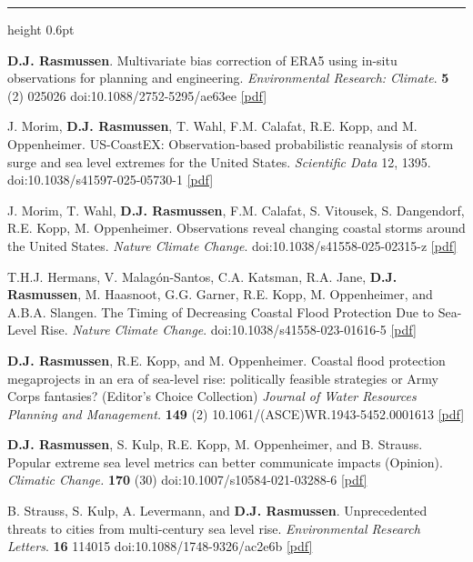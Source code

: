 \documentclass[10.5pt]{article}
\newcommand{\cvsection}[1]{%
  \par\addvspace{12pt}\pagebreak[3]%
  {\sffamily\bfseries\small\textls[80]{\MakeUppercase{#1}}}%
  \par\vspace{2pt}%
  {\color{rulegray}\hrule height 0.6pt}%
  \vspace{5pt}\nopagebreak}
\renewcommand{\section}[1]{\cvsection{#1}}
\newcommand{\yr}[1]{{\sffamily\bfseries #1}}
\begin{document}
\section{Journal Articles}
\begin{entries}
\item[\yr{2026}] \textbf{D.J. Rasmussen}. Multivariate bias correction of ERA5 using in-situ observations for planning and engineering. \emph{Environmental Research: Climate}. \textbf{5} (2) 025026 doi:10.1088/2752-5295/ae63ee \href{https://iopscience.iop.org/article/10.1088/2752-5295/ae63ee/pdf}{[pdf]}
\item[\yr{2025}] J. Morim, \textbf{D.J. Rasmussen}, T. Wahl, F.M. Calafat, R.E. Kopp, and M. Oppenheimer. US-CoastEX: Observation-based probabilistic reanalysis of storm surge and sea level extremes for the United States. \emph{Scientific Data} 12, 1395. doi:10.1038/s41597-025-05730-1 \href{https://www.nature.com/articles/s41597-025-05730-1.pdf}{[pdf]}
\item[\yr{2025}] J. Morim, T. Wahl, \textbf{D.J. Rasmussen}, F.M. Calafat, S. Vitousek, S. Dangendorf, R.E. Kopp, M. Oppenheimer. Observations reveal changing coastal storms around the United States. \emph{Nature Climate Change}. doi:10.1038/s41558-025-02315-z \href{https://www.nature.com/articles/s41558-025-02315-z}{[pdf]}
\item[\yr{2023}] T.H.J. Hermans, V. Malagón-Santos, C.A. Katsman, R.A. Jane, \textbf{D.J. Rasmussen}, M. Haasnoot, G.G. Garner, R.E. Kopp, M. Oppenheimer, and A.B.A. Slangen. The Timing of Decreasing Coastal Flood Protection Due to Sea-Level Rise. \emph{Nature Climate Change}. doi:10.1038/s41558-023-01616-5 \href{https://www.nature.com/articles/s41558-023-01616-5}{[pdf]}
\item[\yr{2023}] \textbf{D.J. Rasmussen}, R.E. Kopp, and M. Oppenheimer. Coastal flood protection megaprojects in an era of sea-level rise: politically feasible strategies or Army Corps fantasies? (Editor's Choice Collection) \emph{Journal of Water Resources Planning and Management.} \textbf{149} (2) 10.1061/(ASCE)WR.1943-5452.0001613 \href{https://ascelibrary.org/doi/10.1061/%28ASCE%29WR.1943-5452.0001613}{[pdf]}
\item[\yr{2022}] \textbf{D.J. Rasmussen}, S. Kulp, R.E. Kopp, M. Oppenheimer, and B. Strauss. Popular extreme sea level metrics can better communicate impacts (Opinion). \emph{Climatic Change.} \textbf{170} (30) doi:10.1007/s10584-021-03288-6 \href{https://link.springer.com/article/10.1007/s10584-021-03288-6}{[pdf]}
\item[\yr{2021}] B. Strauss, S. Kulp, A. Levermann, and \textbf{D.J. Rasmussen}. Unprecedented threats to cities from multi-century sea level rise. \emph{Environmental Research Letters}. \textbf{16} 114015 doi:10.1088/1748-9326/ac2e6b \href{https://iopscience.iop.org/article/10.1088/1748-9326/ac2e6b/pdf}{[pdf]}

\end{entries}
\end{document}
